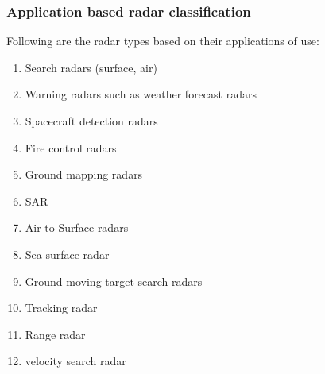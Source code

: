\documentclass[14pt]{article} %
\begin{document}
\subsubsection{Application based radar classification}
 Following are the radar types based on their applications of use: 
\begin{enumerate}
\item	Search radars (surface, air)
\item	Warning radars such as weather forecast radars 
\item	Spacecraft detection radars
\item	Fire control radars
\item	Ground mapping radars
\item	SAR 
\item	Air to Surface radars 
\item	Sea surface radar 
\item	Ground moving target search radars 
\item	 Tracking radar
\item	 Range radar
\item	 velocity search radar
\end{enumerate}
\end{document}
